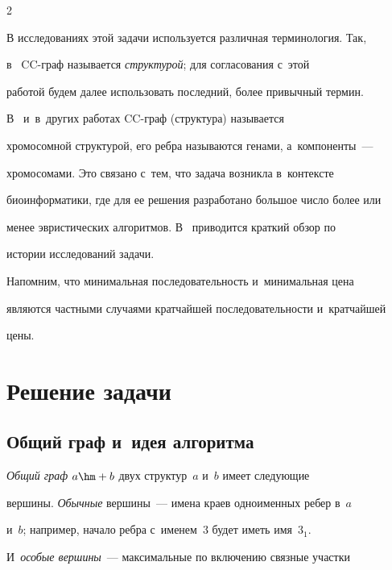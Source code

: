 \begin{multicols}{2}
  


  В исследованиях этой задачи используется различная терминология. Так, 


в~\cite{2-gor} CC-граф называется \textit{структурой}; для согласования с~этой 


работой будем далее использовать последний, более привычный термин. 


В~\cite{3-gor} и~в~других работах CC-граф (структура) называется 


хромосомной структурой, его реб\-ра называются генами, а~компоненты~--- 


хромосомами. Это связано с~тем, что задача возникла в~контексте 


биоинформатики, где для ее решения разработано большое число более или 


менее эвристических алгоритмов. В~\cite{3-gor} приводится краткий обзор по 


истории исследований задачи. 





  


  Напомним, что минимальная последовательность и~минимальная цена 


являются частными случаями кратчайшей последовательности и~кратчайшей 


цены. 


  


  \section{Решение задачи }


  


  \subsection{Общий граф и~идея алгоритма}


  


  \textit{Общий граф} $a\hm+b$ двух структур~$a$ и~$b$ имеет следующие 


вершины. \textit{Обычные} вершины~--- имена краев одноименных ребер в~$a$ 


и~$b$; например, начало реб\-ра с~именем~3 будет иметь имя~3$_1$. 


И~\textit{особые вершины}~--- максимальные по включению связные участки 



\end{multicols}
